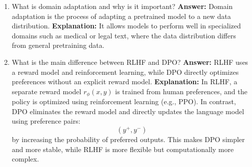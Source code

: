 \documentclass{article}
\begin{document}
\begin{enumerate}
\item What is domain adaptation and why is it important?\newline
\textbf{Answer:} Domain adaptation is the process of adapting a pretrained model to a new data distribution.\newline
\textbf{Explanation:} It allows models to perform well in specialized domains such as medical or legal text, where the data distribution differs from general pretraining data.

\item What is the main difference between RLHF and DPO?\newline
\textbf{Answer:} RLHF uses a reward model and reinforcement learning, while DPO directly optimizes preferences without an explicit reward model.\newline
\textbf{Explanation:} In RLHF, a separate reward model $r_\phi(x,y)$ is trained from human preferences, and the policy is optimized using reinforcement learning (e.g., PPO). In contrast, DPO eliminates the reward model and directly updates the language model using preference pairs:
\[
(y^+, y^-)
\]
by increasing the probability of preferred outputs. This makes DPO simpler and more stable, while RLHF is more flexible but computationally more complex.

\end{enumerate}




\end{document}
